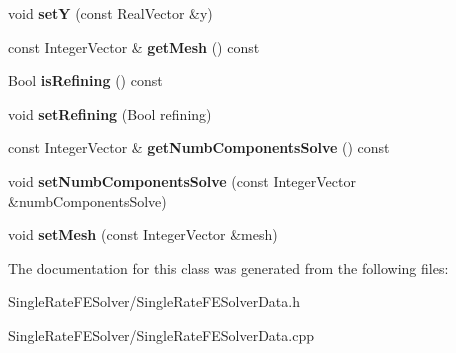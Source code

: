 \begin{DoxyCompactItemize}
\item 
\hypertarget{classSingleRateFESolverData_a01acff39ea246981730bc410f6ebc78d}{
void {\bfseries setY} (const RealVector \&y)}
\label{classSingleRateFESolverData_a01acff39ea246981730bc410f6ebc78d}

\item 
\hypertarget{classSingleRateFESolverData_a20238df7a7605992c1b88766fd009643}{
const IntegerVector \& {\bfseries getMesh} () const }
\label{classSingleRateFESolverData_a20238df7a7605992c1b88766fd009643}

\item 
\hypertarget{classSingleRateFESolverData_af27ca6658e5f521ed6168d1f7e2a2ca2}{
Bool {\bfseries isRefining} () const }
\label{classSingleRateFESolverData_af27ca6658e5f521ed6168d1f7e2a2ca2}

\item 
\hypertarget{classSingleRateFESolverData_a7b855d3316ff393770edaeb1b313bfd5}{
void {\bfseries setRefining} (Bool refining)}
\label{classSingleRateFESolverData_a7b855d3316ff393770edaeb1b313bfd5}

\item 
\hypertarget{classSingleRateFESolverData_a383c5301131d7a6dad537f9af76fcfb3}{
const IntegerVector \& {\bfseries getNumbComponentsSolve} () const }
\label{classSingleRateFESolverData_a383c5301131d7a6dad537f9af76fcfb3}

\item 
\hypertarget{classSingleRateFESolverData_af51e1c99af7dcdbf7d9f4239d49b27b2}{
void {\bfseries setNumbComponentsSolve} (const IntegerVector \&numbComponentsSolve)}
\label{classSingleRateFESolverData_af51e1c99af7dcdbf7d9f4239d49b27b2}

\item 
\hypertarget{classSingleRateFESolverData_a4ec292a9e1c974ac89452320fbd0663f}{
void {\bfseries setMesh} (const IntegerVector \&mesh)}
\label{classSingleRateFESolverData_a4ec292a9e1c974ac89452320fbd0663f}

\end{DoxyCompactItemize}


The documentation for this class was generated from the following files:\begin{DoxyCompactItemize}
\item 
SingleRateFESolver/SingleRateFESolverData.h\item 
SingleRateFESolver/SingleRateFESolverData.cpp\end{DoxyCompactItemize}
